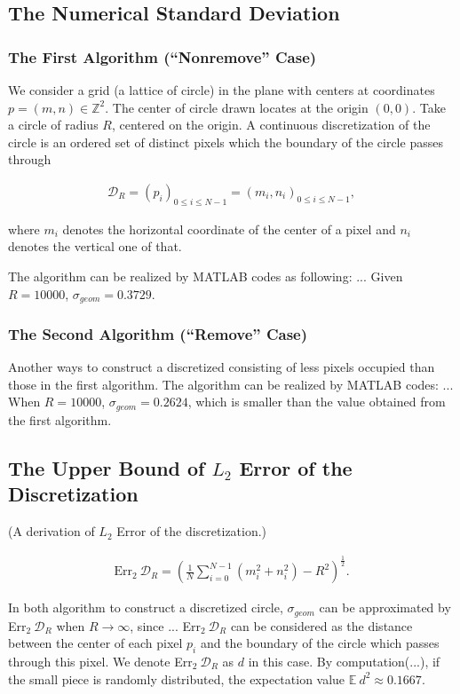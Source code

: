 \documentclass[letterpaper]{article}
\numberwithin{equation}{section} %
\numberwithin{figure}{section} %
\numberwithin{table}{section} %
\begin{document}
\subsection{The Numerical Standard Deviation}

\subsubsection{The First Algorithm (\enquote{Nonremove} Case)}
We consider a grid (a lattice of circle) in the plane with centers at coordinates $p=(m, n)\in\mathbb{Z}^2$. The center of circle drawn locates at the origin $(0,0)$. Take a circle of radius $R$, centered on the origin. A continuous discretization of the circle is an ordered set of distinct pixels which the boundary of the circle passes through

\begin{align} 
\mathcal{D}_R=(p_{i})_{0 \leq i \leq N-1} = (m_i, n_i)_{0 \leq i \leq N-1},
\end{align}

where $m_i$ denotes the horizontal coordinate of the center of a pixel and $n_i$ denotes the vertical one of that.

The algorithm can be realized by MATLAB codes as following: ... Given $R=10000$, $\sigma_{geom}=0.3729$.

	
\subsubsection{The Second Algorithm (\enquote{Remove} Case)}

Another ways to construct a discretized consisting of less pixels occupied than those in the first algorithm. The algorithm can be realized by MATLAB codes: ... When $R=10000$, $\sigma_{geom}=0.2624$, which is smaller than the value obtained from the first algorithm.

\subsection{The Upper Bound of $L_{2}$ Error of the Discretization}

(A derivation of $L_{2}$ Error of the discretization.)

\begin{align} 
\text{Err}_2 \ \mathcal{D}_R=(\frac{1}{N} \sum_{i=0}^{N-1} (m_i^2+n_i^2)-R^2)^{\frac{1}{2}}.
\end{align}


In both algorithm to construct a discretized circle, $\sigma_{geom}$ can be approximated by Err$_2 \ \mathcal{D}_R$ when $R \rightarrow \infty$, since ... Err$_2 \ \mathcal{D}_R$ can be considered as the distance between the center of each pixel $p_i$ and the boundary of the circle which passes through this pixel. We denote Err$_2 \ \mathcal{D}_R$ as $d$ in this case. By computation(...), if the small piece is randomly distributed, the expectation value $\mathbb{E}\ d^2 \approx 0.1667$. 
\end{document}
